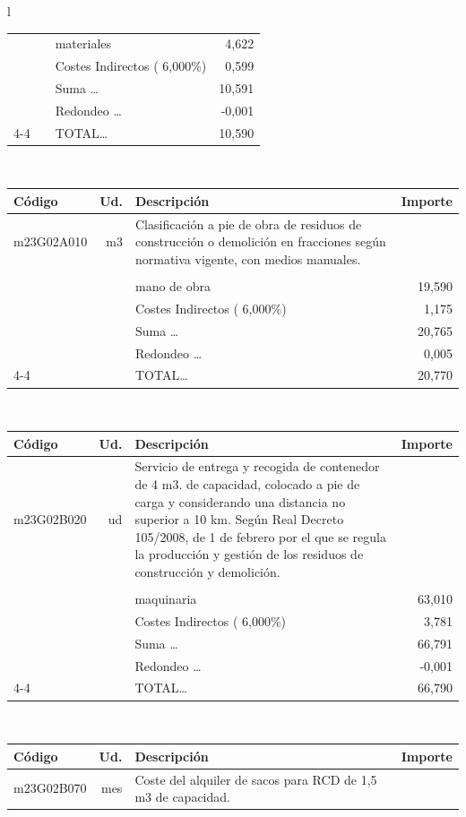 \documentclass{book}%
\begin{document}
\begin{longtable}{l}
\begin{tabular}{l r p{60mm} r}
&&materiales&     4,622\\%
&&Costes Indirectos (     6,000\%)&     0,599\\%
&&Suma \ldots&    10,591\\%
&&Redondeo \ldots&    {-}0,001\\%
\cline{4-4}%
&&TOTAL\ldots&    10,590\\%
\end{tabular}\\%
\begin{tabular}{l r p{60mm} r}%
Código&Ud.&Descripción&Importe\\%
\hline%
m23G02A010&m3&Clasificación a pie de obra de residuos de construcción o demolición en fracciones según normativa vigente, con medios manuales.&\\%
&&&\\%
&&mano de obra&    19,590\\%
&&Costes Indirectos (     6,000\%)&     1,175\\%
&&Suma \ldots&    20,765\\%
&&Redondeo \ldots&     0,005\\%
\cline{4-4}%
&&TOTAL\ldots&    20,770\\%
\end{tabular}\\%
\begin{tabular}{l r p{60mm} r}%
Código&Ud.&Descripción&Importe\\%
\hline%
m23G02B020&ud&Servicio de entrega y recogida de contenedor de 4 m3. de capacidad, colocado a pie de carga y considerando una distancia no superior a 10 km. Según Real Decreto 105/2008, de 1 de febrero por el que se regula la producción y gestión de los residuos de construcción y demolición.&\\%
&&&\\%
&&maquinaria&    63,010\\%
&&Costes Indirectos (     6,000\%)&     3,781\\%
&&Suma \ldots&    66,791\\%
&&Redondeo \ldots&    {-}0,001\\%
\cline{4-4}%
&&TOTAL\ldots&    66,790\\%
\end{tabular}\\%
\begin{tabular}{l r p{60mm} r}%
Código&Ud.&Descripción&Importe\\%
\hline%
m23G02B070&mes&Coste del alquiler de sacos para RCD de 1,5 m3 de capacidad.&\\%

\end{tabular}
\end{longtable}
\end{document}

